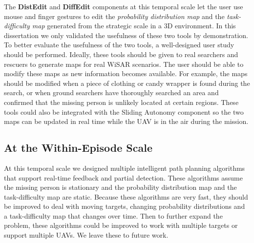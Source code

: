 The \textbf{DistEdit} and \textbf{DiffEdit} components at this temporal scale let the user use mouse and finger gestures to edit the \textit{probability distribution map} and the \textit{task-difficulty map} generated from the strategic scale in a 3D environment. In this dissertation we only validated the usefulness of these two tools by demonstration. To better evaluate the usefulness of the two tools, a well-designed user study should be performed. Ideally, these tools should be given to real searchers and rescuers to generate maps for real WiSAR scenarios. The user should be able to modify these maps as new information becomes available. For example, the maps should be modified when a piece of clothing or candy wrapper is found during the search, or when ground searchers have thoroughly searched an area and confirmed that the missing person is unlikely located at certain regions. These tools could also be integrated with the Sliding Autonomy component so the two maps can be updated in real time while the UAV is in the air during the mission.

\subsection{At the Within-Episode Scale}

At this temporal scale we designed multiple intelligent path planning algorithms that support real-time feedback and partial detection. These algorithms assume the missing person is stationary and the probability distribution map and the task-difficulty map are static. Because these algorithms are very fast, they should be improved to deal with moving targets, changing probability distributions and a task-difficulty map that changes over time. Then to further expand the problem, these algorithms could be improved to work with multiple targets or support multiple UAVs. We leave these to future work.

